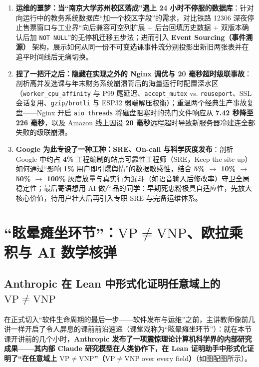 \documentclass[a4paper]{article}
\begin{document}
\begin{enumerate}
    \item \textbf{运维的噩梦：当“南京大学苏州校区落成”遇上 24 小时不停服的数据库}：针对向运行中的教务系统数据库“加一个校区字段”的需求，对比铁路 12306 深夜停止售票窗口与工业界“向后兼容可空列扩展 + 后台回填历史数据 + 双版本确认后加 \texttt{NOT NULL}”的无停机迁移五步法；进而引入 \textbf{Event Sourcing（事件溯源）} 架构，展示如何从同一份不可变选课事件流分别投影出新旧两张表并在追平时间线后无痛切换。
    \item \textbf{捏了一把汗之后：隐藏在实现之外的 Nginx 调优与 20 毫秒超时级联事故}：剖析高并发选课与年末财务系统崩溃背后的海量运行时配置深水区（\texttt{worker\_cpu\_affinity} 与 P99 尾延迟、\texttt{accept\_mutex} vs. \texttt{reuseport}、SSL 会话复用、\texttt{gzip/brotli} 与 ESP32 弱端解压权衡）；重温两个经典生产事故复盘——Nginx 开启 \texttt{aio threads} 将磁盘阻塞时的热门文件响应从 \textbf{7.42 秒降至 226 毫秒}，以及 Amazon 线上因设 \textbf{20 毫秒}远程超时导致新服务器冷建连全部失败的级联崩溃。
    \item \textbf{Google 为此专设了一种工种：SRE、On-call 与科学灰度发布}：剖析 Google 中约占 \textbf{4\%} 工程编制的站点可靠性工程师（SRE，Keep the site up）如何通过“影响 \textbf{1\%} 用户即引爆舆情”的数据敏感性，结合 \textbf{5\% $\to$ 10\% $\to$ 50\% $\to$ 100\%} 灰度放量与真实行为漏斗（如语音输入后修改率）守卫全局稳定性；最后寄语想用 AI 做产品的同学：早期死忠粉极具自适应性，先放大核心价值，待用户壮大后再引入专职 SRE 与完备运维体系。
\end{enumerate}

\newpage
\tableofcontents
\newpage

\section{“眩晕瘫坐环节”：$\mathrm{VP} \neq \mathrm{VNP}$、欧拉乘积与 AI 数学核弹}

\subsection{Anthropic 在 Lean 中形式化证明任意域上的 $\mathrm{VP} \neq \mathrm{VNP}$}

在正式切入“软件生命周期的最后一步——软件发布与运维”之前，主讲教师像前几讲一样开启了令人屏息的课前前沿速递（课堂戏称为“眩晕瘫坐环节”）：就在本节课开讲前的几个小时，\textbf{Anthropic 发布了一项震惊理论计算机科学界的内部研究成果——其内部 Claude 研究模型在人类协作下，在 Lean 证明助手中形式化证明了“在任意域上 $\mathrm{VP} \neq \mathrm{VNP}$”（$\mathrm{VP} \neq \mathrm{VNP}\;\text{over every field}$）}（如图配图所示）。
\end{document}
